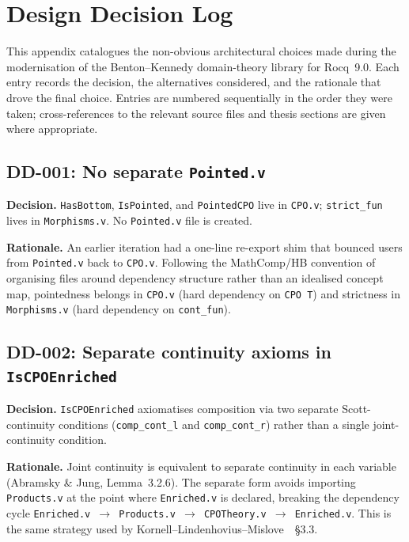 \chapter{Design Decision Log}
\label{app:design-decisions}

This appendix catalogues the non-obvious architectural choices made
during the modernisation of the Benton--Kennedy domain-theory library for
Rocq~9.0.  Each entry records the decision, the alternatives considered,
and the rationale that drove the final choice.  Entries are numbered
sequentially in the order they were taken; cross-references to the
relevant source files and thesis sections are given where appropriate.

\section*{DD-001: No separate \texttt{Pointed.v}}

\textbf{Decision.}
\texttt{HasBottom}, \texttt{IsPointed}, and \texttt{PointedCPO} live in
\texttt{CPO.v}; \texttt{strict\_fun} lives in \texttt{Morphisms.v}.
No \texttt{Pointed.v} file is created.

\textbf{Rationale.}
An earlier iteration had a one-line re-export shim that bounced users
from \texttt{Pointed.v} back to \texttt{CPO.v}.  Following the
MathComp/HB convention of organising files around dependency structure
rather than an idealised concept map, pointedness belongs in
\texttt{CPO.v} (hard dependency on \texttt{CPO~T}) and strictness in
\texttt{Morphisms.v} (hard dependency on \texttt{cont\_fun}).

\section*{DD-002: Separate continuity axioms in \texttt{IsCPOEnriched}}

\textbf{Decision.}
\texttt{IsCPOEnriched} axiomatises composition via two separate
Scott-continuity conditions (\texttt{comp\_cont\_l} and
\texttt{comp\_cont\_r}) rather than a single joint-continuity condition.

\textbf{Rationale.}
Joint continuity is equivalent to separate continuity in each variable
(Abramsky \& Jung, Lemma~3.2.6).  The separate form avoids importing
\texttt{Products.v} at the point where \texttt{Enriched.v} is declared,
breaking the dependency cycle
\texttt{Enriched.v $\to$ Products.v $\to$ CPOTheory.v $\to$ Enriched.v}.
This is the same strategy used by
Kornell--Lindenhovius--Mislove~\cite{KLM2024}~\S3.3.

